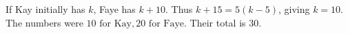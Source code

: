 If Kay initially has $k$, Faye has $k+10$. Thus $k+15=5(k-5)$, giving $k=10$. The numbers were $\boxed{10\text{ for Kay},20\text{ for Faye}}$. Their total is $\boxed{30}$.
